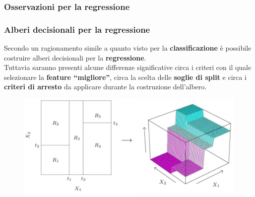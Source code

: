 \subsubsection[Osservazioni per la regressione]{Osservazioni per la regressione}
\begin{frame}
	
	\frametitle{Alberi decisionali per la regressione}
	
	Secondo un ragionamento simile a quanto visto per la \textbf{classificazione} è possibile costruire alberi decisionali per la \textbf{regressione}.\\
	Tuttavia saranno presenti alcune differenze significative circa i criteri con il quale selezionare la \textbf{feature ``migliore''}, circa la scelta delle \textbf{soglie di split} e circa i \textbf{criteri di arresto} da applicare durante la costruzione dell'albero.
	\newlinedouble
	
	\begin{figure}[!htbp]
		\centering
		\includegraphics[width=0.7\linewidth]{images/supervised/decision_trees/regression_tree_example.png}
	\end{figure}
	
\end{frame}



